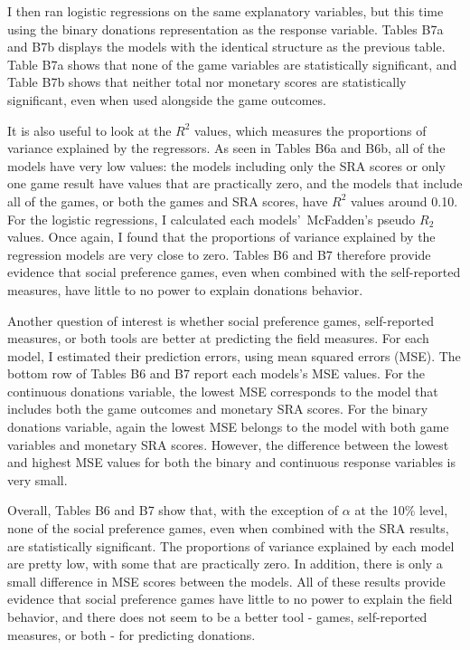 \documentclass[12pt]{article}
\begin{document}
I then ran logistic regressions on the same explanatory variables, but this time using the binary donations representation as the response variable. Tables B7a and B7b displays the models with the identical structure as the previous table. Table B7a shows that none of the game variables are statistically significant, and Table B7b shows that neither total nor monetary scores are statistically significant, even when used alongside the game outcomes.

It is also useful to look at the \(R^{2}\) values, which measures the proportions of variance explained by the regressors. As seen in Tables B6a and B6b, all of the models have very low values: the models including only the SRA scores or only one game result have values that are practically zero, and the models that include all of the games, or both the games and SRA scores, have \(R^{2}\) values around 0.10. For the logistic regressions, I calculated each models\rq \ McFadden\rq s pseudo \(R_{2}\) values. Once again, I found that the proportions of variance explained by the regression models are very close to zero. Tables B6 and B7 therefore provide evidence that social preference games, even when combined with the self-reported measures, have little to no power to explain donations behavior.

Another question of interest is whether social preference games, self-reported measures, or both tools are better at predicting the field measures. For each model, I estimated their prediction errors, using mean squared errors (MSE). The bottom row of Tables B6 and B7 report each models\rq s MSE values. For the continuous donations variable, the lowest MSE corresponds to the model that includes both the game outcomes and monetary SRA scores. For the binary donations variable, again the lowest MSE belongs to the model with both game variables and monetary SRA scores. However, the difference between the lowest and highest MSE values for both the binary and continuous response variables is very small.

Overall, Tables B6 and B7 show that, with the exception of \(\alpha\) at the 10\% level, none of the social preference games, even when combined with the SRA results, are statistically significant. The proportions of variance explained by each model are pretty low, with some that are practically zero. In addition, there is only a small difference in MSE scores between the models. All of these results provide evidence that social preference games have little to no power to explain the field behavior, and there does not seem to be a better tool - games, self-reported measures, or both - for predicting donations.
\end{document}
